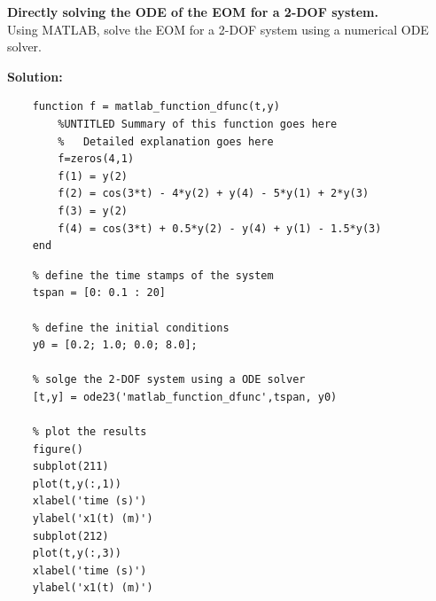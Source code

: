 \documentclass[12pt,letter]{article}
\begin{document}
	
	\begin{example}
	\textbf{Directly solving the ODE of the EOM for a 2-DOF system.} \\
	
Using MATLAB, solve the EOM for a 2-DOF system using a numerical ODE solver.

\noindent \textbf{Solution:} 
	
		\lstset{linewidth=5.8in}
		\begin{minipage}{1\textwidth}
			\begin{center}
				\begin{lstlisting}
	function f = matlab_function_dfunc(t,y)
		%UNTITLED Summary of this function goes here
		%   Detailed explanation goes here
		f=zeros(4,1)
		f(1) = y(2)
		f(2) = cos(3*t) - 4*y(2) + y(4) - 5*y(1) + 2*y(3)
		f(3) = y(2)
		f(4) = cos(3*t) + 0.5*y(2) - y(4) + y(1) - 1.5*y(3)
	end 
				\end{lstlisting}
			\end{center}
		\end{minipage}
	
	
	
	
	
		\lstset{linewidth=5.8in}
		\begin{minipage}{1\textwidth}
			\begin{center}
				\begin{lstlisting}
	% define the time stamps of the system
	tspan = [0: 0.1 : 20]
	
	% define the initial conditions
	y0 = [0.2; 1.0; 0.0; 8.0];
	
	% solge the 2-DOF system using a ODE solver
	[t,y] = ode23('matlab_function_dfunc',tspan, y0)
	
	% plot the results
	figure()
	subplot(211)
	plot(t,y(:,1))
	xlabel('time (s)')
	ylabel('x1(t) (m)')
	subplot(212)
	plot(t,y(:,3))
	xlabel('time (s)')
	ylabel('x1(t) (m)')
				\end{lstlisting}
			\end{center}
		\end{minipage}
	
	\end{example}
	
\end{document}
